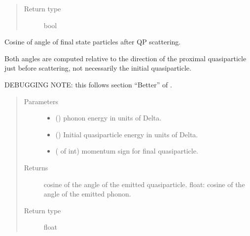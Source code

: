 \documentclass[letterpaper,10pt,english]{sphinxmanual}
\begin{document}
\begin{fulllineitems}
\begin{fulllineitems}
\begin{quote}
\begin{description}
\item[{Return type}] \leavevmode
bool

\end{description}\end{quote}

\end{fulllineitems}


\begin{fulllineitems}
\label{\detokenize{code_structure:scdc.interaction.QuasiparticlePhononEmission.final_state_angles}}
Cosine of angle of final state particles after QP scattering.

Both angles are computed relative to the direction of the proximal
quasiparticle just before scattering, not necessarily the initial
quasiparticle.

DEBUGGING NOTE: this follows section “Better” of .
\begin{quote}\begin{description}
\item[{Parameters}] \leavevmode\begin{itemize}
\item {} 
 () \textendash{} phonon energy in units of Delta.

\item {} 
 () \textendash{} Initial quasiparticle energy in units of Delta.

\item {} 
 ( of int) \textendash{} momentum sign for final quasiparticle.

\end{itemize}

\item[{Returns}] \leavevmode
cosine of the angle of the emitted quasiparticle.
float: cosine of the angle of the emitted phonon.

\item[{Return type}] \leavevmode
float


\end{description}
\end{quote}
\end{fulllineitems}
\end{fulllineitems}
\end{document}
